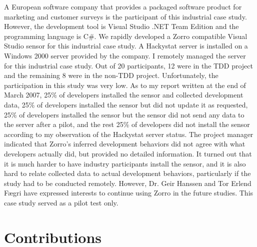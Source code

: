 A European software company that provides a packaged software product for marketing and customer surveys \cite{Hanssen:06} is the participant of this industrial case study. However, the development tool is Visual Studio .NET Team Edition and the programming language is C\#. We rapidly developed a Zorro compatible Visual Studio sensor for this industrial case study. A Hackystat server is installed on a Windows 2000 server provided by the company. I remotely managed the server for this industrial case study. Out of 20 participants, 12 were in the TDD project and the remaining 8 were in the non-TDD project. Unfortunately, the participation in this study was very low. As to my report written at the end of March 2007, 25\% of developers installed the sensor and collected development data,  25\% of developers installed the sensor but did not update it as requested, 25\% of developers installed the sensor but the sensor did not send any data to the server after a pilot, and the rest 25\% of developers did not install the sensor according to my 
observation of the Hackystat server status. The project manager indicated that Zorro's inferred development behaviors did not agree with what developers actually did, but provided no detailed information. It turned out that it is much harder to have industry participants install the sensor, and it is also hard to relate collected data to actual development behaviors, particularly if the study had to be conducted remotely. However, Dr. Geir Hanssen and Tor Erlend F{\ae}gri have expressed interests to continue using Zorro in the future studies. This case study served as a pilot test only.  

\section{Contributions}

